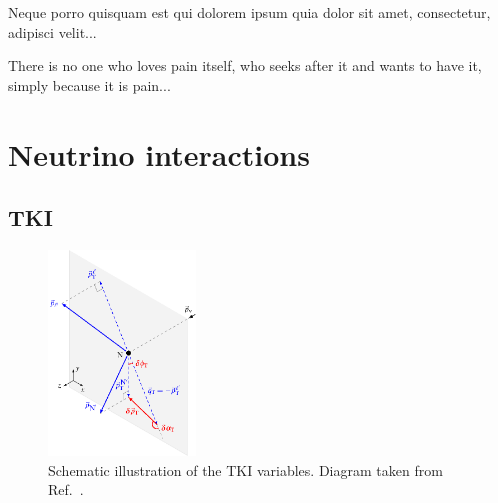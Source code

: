 \begin{savequote}[8cm]
\textlatin{Neque porro quisquam est qui dolorem ipsum quia dolor sit amet, consectetur, adipisci velit...}

There is no one who loves pain itself, who seeks after it and wants to have it, simply because it is pain...
\end{savequote}

\chapter{\label{ch:35-nuint}Neutrino interactions} 


\section{TKI}
\label{sec:nuint-tki}
\minitoc

\begin{figure}[!htb] 	
    \centering 		
    \includegraphics[width=0.35\textwidth]{figures/stki.eps}
    \caption{\label{fig:stki} Schematic illustration of the TKI variables. Diagram taken from Ref.~\cite{Lu:2015tcr}.} 
\end{figure}

